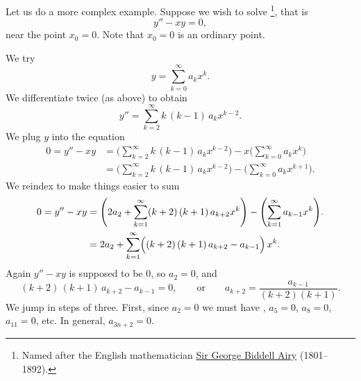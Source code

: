 \begin{example}
Let us do a more complex example.  Suppose we wish to solve
\emph{}%
\footnote{Named after the English mathematician
\href{http://en.wikipedia.org/wiki/George_Biddell_Airy}{Sir George Biddell Airy}
(1801--1892).}, that is
\begin{equation*}
y'' - xy = 0 ,
\end{equation*}
near the point $x_0 = 0$.  Note that $x_0 = 0$ is an ordinary point.

We try
\begin{equation*}
y = \sum_{k=0}^\infty a_k x^k .
\end{equation*}
We differentiate twice (as above) to obtain
\begin{equation*}
y'' = \sum_{k=2}^\infty k\,(k-1) \, a_k x^{k-2} .
\end{equation*}
We plug $y$ into the equation
\begin{equation*}
\begin{split}
0 = y''-xy &= 
\Biggl( \sum_{k=2}^\infty k\,(k-1) \, a_k x^{k-2}  \Biggr)
-
x
\Biggl( \sum_{k=0}^\infty a_k x^k \Biggr)
\\
&=
\Biggl( \sum_{k=2}^\infty k\,(k-1) \, a_k x^{k-2}  \Biggr)
-
\Biggl( \sum_{k=0}^\infty a_k x^{k+1} \Biggr) .
\end{split}
\end{equation*}
We reindex to make things easier to sum
\begin{equation*}
\begin{split}
0 = y''-xy
&= 
\Biggl( 2 a_2 + \sum_{k=1}^\infty (k+2)\,(k+1) \, a_{k+2} x^k  \Biggr)
-
\Biggl( \sum_{k=1}^\infty a_{k-1} x^k \Biggr) .
\\
&= 
2 a_2 + 
\sum_{k=1}^\infty \Bigl( (k+2)\,(k+1) \, a_{k+2} - a_{k-1} \Bigr) \, x^k .
\end{split}
\end{equation*}
Again $y''-xy$ is supposed to be 0, so $a_2 = 0$, and
\begin{equation*}
(k+2)\,(k+1) \,a_{k+2} - a_{k-1} = 0 ,
\qquad
\text{or}
\qquad
a_{k+2} = \frac{a_{k-1}}{(k+2)(k+1)} .
\end{equation*}
We jump in steps of three.  First, since $a_2 = 0$
we must have , $a_5 = 0$, $a_8 = 0$, $a_{11}=0$, etc.
In general, $a_{3n+2} = 0$.


\end{example}
